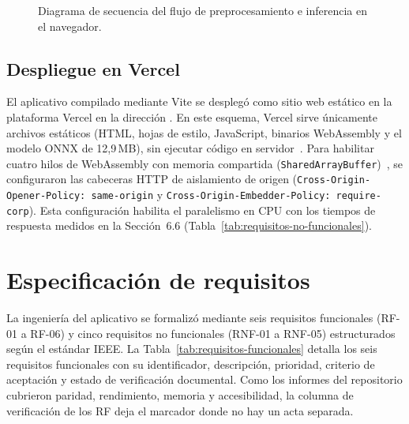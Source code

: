\begin{figure}[H]
  \centering
  \caption{Diagrama de secuencia del flujo de preprocesamiento e inferencia en el navegador.}
  \label{fig:secuencia}
\end{figure}

\subsection{Despliegue en Vercel}

El aplicativo compilado mediante Vite se desplegó como sitio web estático en la plataforma Vercel en la dirección . En este esquema, Vercel sirve únicamente archivos estáticos (HTML, hojas de estilo, JavaScript, binarios WebAssembly y el modelo ONNX de 12,9\,MB), sin ejecutar código en servidor~\cite{ning2024onnxweb}. Para habilitar cuatro hilos de WebAssembly con memoria compartida (\texttt{SharedArrayBuffer})~\cite{ning2024onnxweb}, se configuraron las cabeceras HTTP de aislamiento de origen (\texttt{Cross-Origin-Opener-Policy: same-origin} y \texttt{Cross-Origin-Embedder-Policy: require-corp}). Esta configuración habilita el paralelismo en CPU con los tiempos de respuesta medidos en la Sección~6.6 (Tabla~\ref{tab:requisitos-no-funcionales}).

\section{Especificación de requisitos}

La ingeniería del aplicativo se formalizó mediante seis requisitos funcionales (RF-01 a RF-06) y cinco requisitos no funcionales (RNF-01 a RNF-05) estructurados según el estándar IEEE. La Tabla~\ref{tab:requisitos-funcionales} detalla los seis requisitos funcionales con su identificador, descripción, prioridad, criterio de aceptación y estado de verificación documental. Como los informes del repositorio cubrieron paridad, rendimiento, memoria y accesibilidad, la columna de verificación de los RF deja el marcador donde no hay un acta separada.

